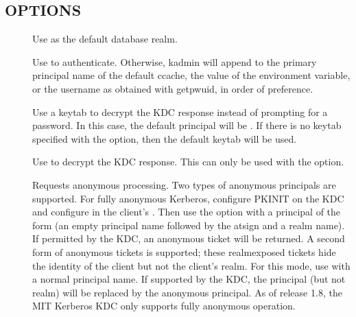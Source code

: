 \documentclass[letterpaper,10pt,english]{sphinxmanual}
\begin{document}
\subsection{OPTIONS}
\label{\detokenize{admin/admin_commands/kadmin_local:options}}\label{\detokenize{admin/admin_commands/kadmin_local:kadmin-options}}\begin{description}
\item[{ }] \leavevmode
\sphinxAtStartPar
Use  as the default database realm.

\item[{ }] \leavevmode
\sphinxAtStartPar
Use  to authenticate.  Otherwise, kadmin will append
 to the primary principal name of the default ccache,
the value of the  environment variable, or the username as
obtained with getpwuid, in order of preference.

\item[{}] \leavevmode
\sphinxAtStartPar
Use a keytab to decrypt the KDC response instead of prompting for
a password.  In this case, the default principal will be
.  If there is no keytab specified with the
 option, then the default keytab will be used.

\item[{ }] \leavevmode
\sphinxAtStartPar
Use  to decrypt the KDC response.  This can only be used
with the  option.

\item[{}] \leavevmode
\sphinxAtStartPar
Requests anonymous processing.  Two types of anonymous principals
are supported.  For fully anonymous Kerberos, configure PKINIT on
the KDC and configure  in the client’s
{\hyperref[\detokenize{admin/conf_files/krb5_conf:krb5-conf-5}]{}}.  Then use the  option with a principal
of the form  (an empty principal name followed by the
at\sphinxhyphen{}sign and a realm name).  If permitted by the KDC, an anonymous
ticket will be returned.  A second form of anonymous tickets is
supported; these realm\sphinxhyphen{}exposed tickets hide the identity of the
client but not the client’s realm.  For this mode, use  with a normal principal name.  If supported by the KDC, the
principal (but not realm) will be replaced by the anonymous
principal.  As of release 1.8, the MIT Kerberos KDC only supports
fully anonymous operation.


\end{description}
\end{document}
